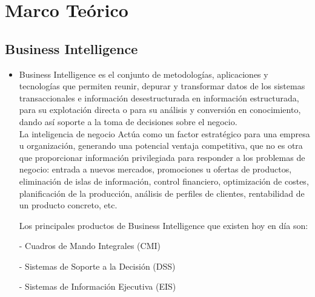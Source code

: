 \documentclass[%
 reprint,
 amsmath,amssymb,
 aps,
]{revtex4-1}
\begin{document}
\section{Marco Teórico}\label{sec:2}
\subsection{Business Intelligence}
	          \begin{itemize}
                    \item Business Intelligence es el conjunto de metodologías, aplicaciones y tecnologías que permiten reunir, depurar y transformar datos de los sistemas transaccionales e información desestructurada  en información estructurada, para su explotación directa  o para su análisis y conversión en conocimiento, dando así soporte a la toma de decisiones sobre el negocio.\cite{Oracle}
\\

La inteligencia de negocio Actúa como un factor estratégico para una empresa u organización, generando una potencial ventaja competitiva, que no es otra que proporcionar información privilegiada para responder a los problemas de negocio: entrada a nuevos mercados, promociones u ofertas de productos, eliminación de islas de información, control financiero, optimización de costes, planificación de la producción, análisis de perfiles de clientes, rentabilidad de un producto concreto, etc.

Los principales productos de Business Intelligence que existen hoy en día son:

-  Cuadros de Mando Integrales (CMI)

-  Sistemas de Soporte a la Decisión (DSS)

-  Sistemas de Información Ejecutiva (EIS)
	          \end{itemize}
\end{document}

